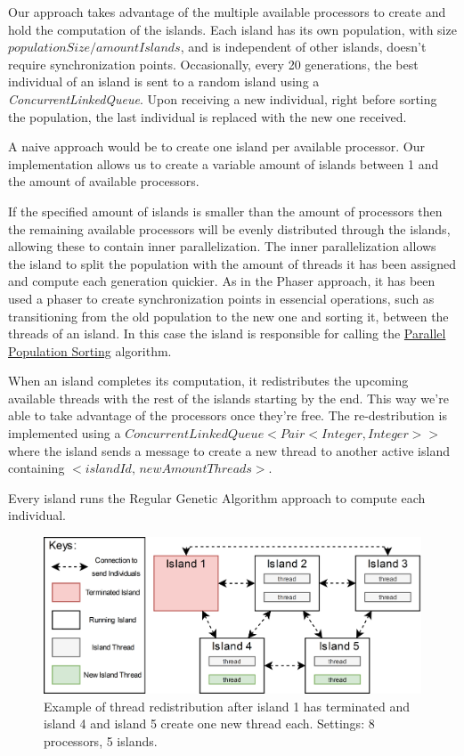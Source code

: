 \documentclass[runningheads]{llncs}
\begin{document}
Our approach takes advantage of the multiple available processors to create and hold the computation of the islands. Each island has its own population, with size  \(populationSize / amountIslands \), and is independent of other islands, doesn't require synchronization points. Occasionally, every 20 generations, the best individual of an island is sent to a random island using a \emph{ConcurrentLinkedQueue}. Upon receiving a new individual, right before sorting the population, the last individual is replaced with the new one received.

A naive approach would be to create one island per available processor. Our implementation allows us to create a variable amount of islands between 1 and the amount of available processors.

 If the specified amount of islands is smaller than the amount of processors then the remaining available processors will be evenly distributed through the islands, allowing these to contain inner parallelization. The inner parallelization allows the island to split the population with the amount of threads it has been assigned and compute each generation quickier. As in the Phaser approach, it has been used a phaser to create synchronization points in essencial operations, such as transitioning from the old population to the new one and sorting it, between the threads of an island. In this case the island is responsible for calling the \hyperref[subsubsec:parallelSort]{Parallel Population Sorting} algorithm.

When an island completes its computation, it redistributes the upcoming available threads with the rest of the islands starting by the end. This way we're able to take advantage of the processors once they're free. The re-destribution is implemented using a \(ConcurrentLinkedQueue<Pair<Integer, Integer>>\) where the island sends a message to create a new thread to another active island containing \(<islandId, \,newAmountThreads>\).

Every island runs the Regular Genetic Algorithm approach to compute each individual.

\begin{figure}[htbp]
\centering
\includegraphics[width=.92\textwidth]{IslandModel.png}
\caption{Example of thread redistribution after island 1 has terminated and island 4 and island 5 create one new thread each. Settings: 8 processors, 5 islands.} \label{islandDiagram}
\end{figure}
\end{document}
